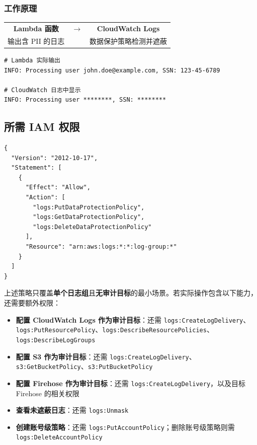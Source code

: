 \documentclass[12pt, a4paper]{article}
\begin{document}
\subsubsection{工作原理}

\begin{center}
\begin{tabular}{@{}ccc@{}}
  \textbf{Lambda 函数} & $\longrightarrow$ & \textbf{CloudWatch Logs} \\
  输出含 PII 的日志 & & 数据保护策略检测并遮蔽 \\
\end{tabular}
\end{center}

\begin{lstlisting}[caption={遮蔽前后对比示意}]
# Lambda 实际输出
INFO: Processing user john.doe@example.com, SSN: 123-45-6789

# CloudWatch 日志中显示
INFO: Processing user ********, SSN: ********
\end{lstlisting}

\subsection{所需 IAM 权限}

\begin{lstlisting}[caption={单个 Log Group 且不配置审计目标时的最小权限（JSON）},
                   language={}]
{
  "Version": "2012-10-17",
  "Statement": [
    {
      "Effect": "Allow",
      "Action": [
        "logs:PutDataProtectionPolicy",
        "logs:GetDataProtectionPolicy",
        "logs:DeleteDataProtectionPolicy"
      ],
      "Resource": "arn:aws:logs:*:*:log-group:*"
    }
  ]
}
\end{lstlisting}

\begin{notebox}
  上述策略只覆盖\textbf{单个日志组}且\textbf{无审计目标}的最小场景。若实际操作包含以下能力，还需要额外权限：
\end{notebox}

\begin{itemize}[leftmargin=2em]
  \item \textbf{配置 CloudWatch Logs 作为审计目标}：还需 \texttt{logs:CreateLogDelivery}、\texttt{logs:PutResourcePolicy}、\texttt{logs:DescribeResourcePolicies}、\texttt{logs:DescribeLogGroups}
  \item \textbf{配置 S3 作为审计目标}：还需 \texttt{logs:CreateLogDelivery}、\texttt{s3:GetBucketPolicy}、\texttt{s3:PutBucketPolicy}
  \item \textbf{配置 Firehose 作为审计目标}：还需 \texttt{logs:CreateLogDelivery}，以及目标 Firehose 的相关权限
  \item \textbf{查看未遮蔽日志}：还需 \texttt{logs:Unmask}
  \item \textbf{创建账号级策略}：还需 \texttt{logs:PutAccountPolicy}；删除账号级策略则需 \texttt{logs:DeleteAccountPolicy}
\end{itemize}
\end{document}
